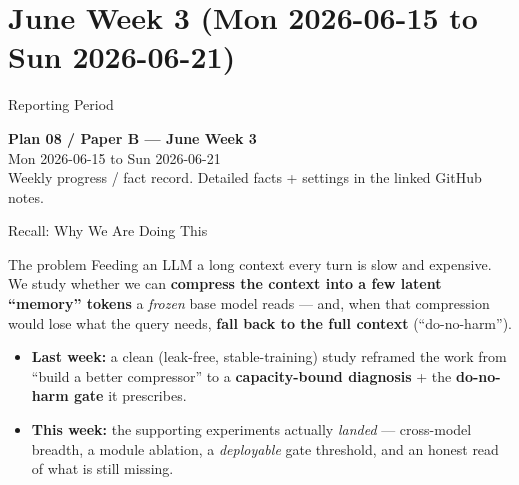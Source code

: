 
\section{June Week 3 (Mon 2026-06-15 to Sun 2026-06-21)}

\begin{frame}{Reporting Period}
  \begin{center}
    \textbf{Plan 08 / Paper B --- June Week 3} \\[0.3em]
    \small Mon 2026-06-15 to Sun 2026-06-21 \\
    \scriptsize Weekly progress / fact record. Detailed facts + settings in the linked GitHub notes.
  \end{center}
\end{frame}

\begin{frame}{Recall: Why We Are Doing This}
  \begin{block}{The problem}
    Feeding an LLM a long context every turn is slow and expensive. We study whether we can \textbf{compress the
    context into a few latent ``memory'' tokens} a \emph{frozen} base model reads --- and, when that compression
    would lose what the query needs, \textbf{fall back to the full context} (``do-no-harm'').
  \end{block}
  \begin{itemize}
    \item \textbf{Last week:} a clean (leak-free, stable-training) study reframed the work from ``build a better
      compressor'' to a \textbf{capacity-bound diagnosis} + the \textbf{do-no-harm gate} it prescribes.
    \item \textbf{This week:} the supporting experiments actually \emph{landed} --- cross-model breadth, a module
      ablation, a \emph{deployable} gate threshold, and an honest read of what is still missing.
  \end{itemize}
\end{frame}

